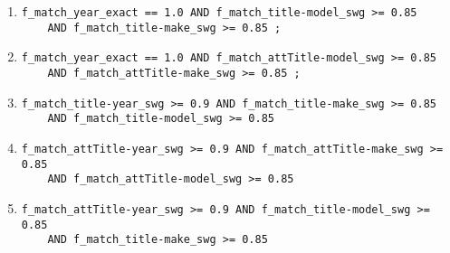 \documentclass[dvips,11pt]{article}
\begin{document}
\vspace{.2in}
\begin{enumerate}
\item
\begin{verbatim}
f_match_year_exact == 1.0 AND f_match_title-model_swg >= 0.85 
    AND f_match_title-make_swg >= 0.85 ;
\end{verbatim}
\item
\begin{verbatim}
f_match_year_exact == 1.0 AND f_match_attTitle-model_swg >= 0.85 
    AND f_match_attTitle-make_swg >= 0.85 ;
\end{verbatim}

\item
\begin{verbatim}
f_match_title-year_swg >= 0.9 AND f_match_title-make_swg >= 0.85 
    AND f_match_title-model_swg >= 0.85
\end{verbatim}

\item
\begin{verbatim}
f_match_attTitle-year_swg >= 0.9 AND f_match_attTitle-make_swg >= 0.85 
    AND f_match_attTitle-model_swg >= 0.85
\end{verbatim}

\item
\begin{verbatim}
f_match_attTitle-year_swg >= 0.9 AND f_match_title-model_swg >= 0.85
    AND f_match_title-make_swg >= 0.85
\end{verbatim}

\end{enumerate}
% 
\end{document}
